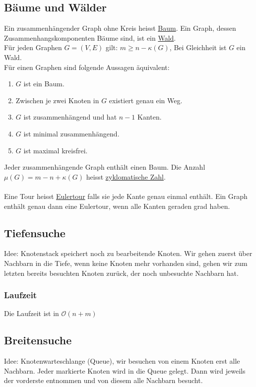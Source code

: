 \documentclass{scrartcl}
\begin{document}
\subsection{Bäume und Wälder}
\begin{shaded}
Ein zusammenhängender Graph ohne Kreis heisst \underline{Baum}. Ein Graph, dessen Zusammenhangskomponenten Bäume sind, ist ein \underline{Wald}. \\
Für jeden Graphen $G=(V,E)$ gilt: $m\geq n-\kappa(G)$, Bei Gleichheit ist $G$ ein Wald.\\ \vspace{2em}
Für einen Graphen sind folgende Aussagen äquivalent:
\begin{enumerate}
	\item $G$ ist ein Baum.
	\item Zwischen je zwei Knoten in $G$ existiert genau ein Weg.
	\item $G$ ist zusammenhängend und hat $n-1$ Kanten.
	\item $G$ ist minimal zusammenhängend.
	\item $G$ ist maximal kreisfrei.
\end{enumerate}
Jeder zusammenhängende Graph enthält einen Baum. Die Anzahl $\mu(G)=m-n+\kappa(G)$ heisst \underline{zyklomatische Zahl}. \\
 \\
Eine Tour heisst \underline{Eulertour} falls sie jede Kante genau einmal enthält. Ein Graph enthält genau dann eine Eulertour, wenn alle Kanten geraden grad haben.
\end{shaded}

\subsection{Tiefensuche}
Idee: Knotenstack speichert noch zu bearbeitende Knoten. Wir gehen zuerst über Nachbarn in die Tiefe, wenn keine Knoten mehr vorhanden sind, gehen wir zum letzten bereits besuchten Knoten zurück, der noch unbesuchte Nachbarn hat.
\subsubsection{Laufzeit}
Die Laufzeit ist in $\mathcal{O}(n+m)$

\subsection{Breitensuche}
Idee: Knotenwarteschlange (Queue), wir besuchen von einem Knoten erst alle Nachbarn. Jeder markierte Knoten wird in die Queue gelegt. Dann wird jeweils der vorderste entnommen und von diesem alle Nachbarn besucht.
\end{document}
